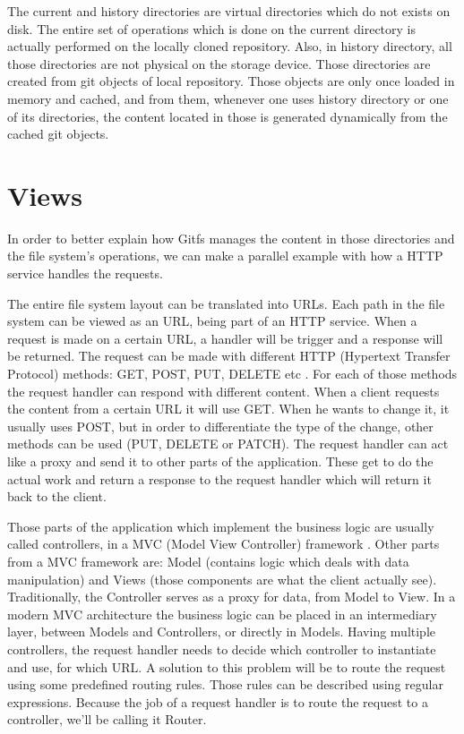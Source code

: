 \begin{figure}[h]
  \begin{center}
    \def\svgwidth{\columnwidth}
    
  \end{center}
\end{figure}

The current and history directories are virtual directories which do not exists on disk. The entire set of operations which is done on the current directory is actually performed on the locally cloned repository. Also, in history directory, all those directories are not physical on the storage device. Those directories are created from git objects of local repository. Those objects are only once loaded in memory and cached, and from them, whenever one uses history directory or one of its directories, the content located in those is generated dynamically from the cached git objects.

\section{Views}
In order to better explain how Gitfs manages the content in those directories and the file system's operations, we can make a parallel example with how a HTTP service handles the requests. 

The entire file system layout can be translated into URLs. Each path in the file system can be viewed as an URL, being part of an HTTP service. When a request is made on a certain URL, a handler will be trigger and a response will be returned. The request can be made with different HTTP (Hypertext Transfer Protocol) methods: GET, POST, PUT, DELETE etc \cite{Fielding1999}. For each of those methods the request handler can respond with different content. When a client requests the content from a certain URL it will use GET. When he wants to change it, it usually uses POST, but in order to differentiate the type of the change, other methods can be used (PUT, DELETE or PATCH). The request handler can act like a proxy and send it to other parts of the application. These get to do the actual work and return a response to the request handler which will return it back to the client.

Those parts of the application which implement the business logic are usually called controllers, in a MVC (Model View Controller) framework \cite{Deacon2009}. Other parts from a MVC framework are: Model (contains logic which deals with data manipulation) and Views (those components are what the client actually see). Traditionally, the Controller serves as a proxy for data, from Model to View. In a modern MVC architecture the business logic can be placed in an intermediary layer, between Models and Controllers, or directly in Models. Having multiple controllers, the request handler needs to decide which controller to instantiate and use, for which URL. A solution to this problem will be to route the request using some predefined routing rules. Those rules can be described using regular expressions. Because the job of a request handler is to route the request to a controller, we'll be calling it Router.

